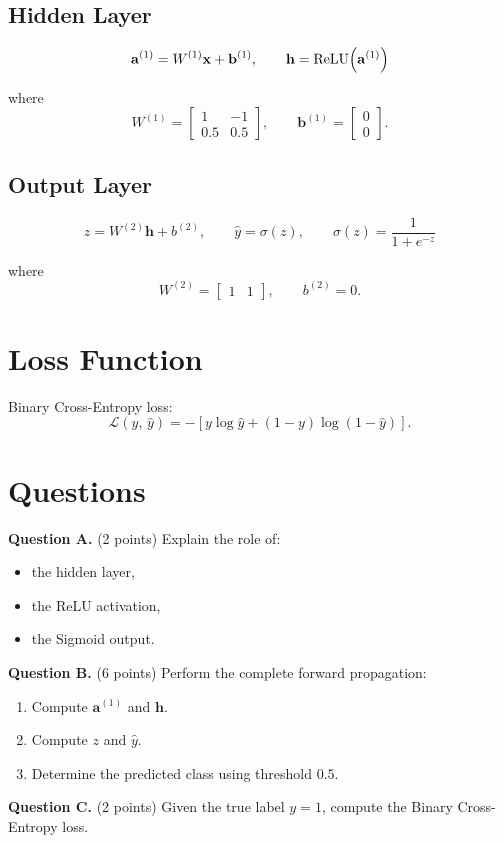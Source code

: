 \documentclass[12pt,a4paper]{article}
\begin{document}
\subsection*{Hidden Layer}

\[
  \mathbf{a}^{(1)} = W^{(1)}\mathbf{x} + \mathbf{b}^{(1)}, \qquad
  \mathbf{h} = \operatorname{ReLU}\!\left(\mathbf{a}^{(1)}\right)
\]

where
\[
  W^{(1)} = \begin{bmatrix} 1 & -1 \\ 0.5 & 0.5 \end{bmatrix}, \qquad
  \mathbf{b}^{(1)} = \begin{bmatrix} 0 \\ 0 \end{bmatrix}.
\]

\subsection*{Output Layer}

\[
  z = W^{(2)}\mathbf{h} + b^{(2)}, \qquad
  \hat{y} = \sigma(z), \qquad
  \sigma(z) = \frac{1}{1 + e^{-z}}
\]

where
\[
  W^{(2)} = \begin{bmatrix} 1 & 1 \end{bmatrix}, \qquad b^{(2)} = 0.
\]

\section*{Loss Function}

Binary Cross-Entropy loss:
\[
  \mathcal{L}(y,\,\hat{y}) = -\left[y \log \hat{y} + (1 - y)\log(1 - \hat{y})\right].
\]

\section*{Questions}

\noindent\textbf{Question A.} (2 points)\quad
Explain the role of:
\begin{itemize}[topsep=2pt, itemsep=2pt]
  \item the hidden layer,
  \item the ReLU activation,
  \item the Sigmoid output.
\end{itemize}

\bigskip
\noindent\textbf{Question B.} (6 points)\quad
Perform the complete forward propagation:
\begin{enumerate}[label=(\alph*), topsep=2pt, itemsep=4pt]
  \item Compute $\mathbf{a}^{(1)}$ and $\mathbf{h}$.
  \item Compute $z$ and $\hat{y}$.
  \item Determine the predicted class using threshold $0.5$.
\end{enumerate}

\bigskip
\noindent\textbf{Question C.} (2 points)\quad
Given the true label $y = 1$, compute the Binary Cross-Entropy loss.
\end{document}
